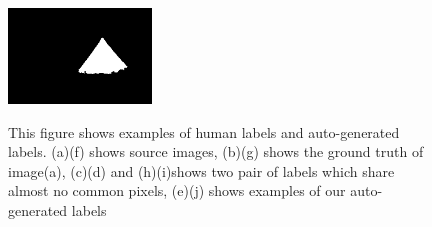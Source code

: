 \documentclass[runningheads,a4paper]{llncs}
\begin{document}
\begin{figure}[!tb]
{\includegraphics[width=0.15\columnwidth,height=1in]{images/188063-gt.png}
}

\caption{ This figure shows examples of human labels and auto-generated labels. (a)(f) shows source images, (b)(g) shows the ground truth of image(a), (c)(d) and (h)(i)shows two pair of labels which share almost no common pixels, (e)(j) shows examples of our auto-generated labels }
\label{fig:example}
\end{figure}
\end{document}
